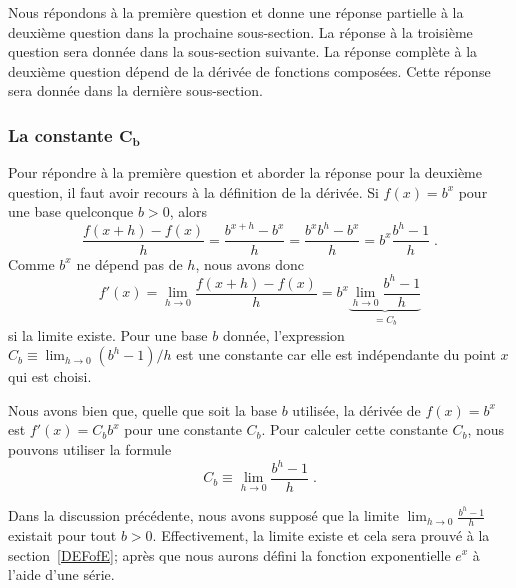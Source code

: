 {Nous répondons à la première question et donne une réponse partielle à la
deuxième question dans la prochaine sous-section.  La réponse à la
troisième question sera donnée dans la sous-section suivante.  La
réponse complète à la deuxième question dépend de la dérivée de
fonctions composées.  Cette réponse sera donnée dans la dernière
sous-section.

\subsubsection{La constante $\mathbf{C_b}$}

Pour répondre à la première question et aborder la réponse pour la
deuxième question, il faut avoir recours à la définition de la
dérivée.  Si $f(x) = b^x$ pour une base quelconque $b>0$, alors
\[
\frac{f(x+h)-f(x)}{h} = \frac{b^{x+h} - b^x}{h}
= \frac{b^x b^h - b^x}{h} = b^x \frac{b^h-1}{h} \; .
\]
Comme $b^x$ ne dépend pas de $h$, nous avons donc
\[
f'(x) = \lim_{h\rightarrow 0} \frac{f(x+h)-f(x)}{h}
= b^x \underbrace{\lim_{h\rightarrow 0} \frac{b^h-1}{h}}_{= C_b}
\]
si la limite existe.  Pour une base $b$ donnée, l'expression
$\displaystyle C_b \equiv \lim_{h\rightarrow 0} (b^h-1)/h$ est une
constante car elle est indépendante du point $x$ qui est choisi.

Nous avons bien que, quelle que soit la base $b$ utilisée, la dérivée de
$f(x)=b^x$ est $f'(x) = C_b b^x$ pour une constante $C_b$.  Pour 
calculer cette constante $C_b$, nous pouvons utiliser la formule
\begin{equation} \label{COND_EXP}
C_b \equiv \lim_{h\rightarrow 0} \frac{b^h-1}{h} \;.
\end{equation}

\begin{rmk}[\theory]
Dans la discussion précédente, nous avons supposé que la limite
$\displaystyle \lim_{h\rightarrow 0} \frac{b^h-1}{h}$ existait pour
tout $b>0$.  Effectivement, la limite existe et cela sera prouvé à la
section~\ref{DEFofE}; après que nous aurons défini la fonction
exponentielle $e^x$ à l'aide d'une série.
\end{rmk}

}
